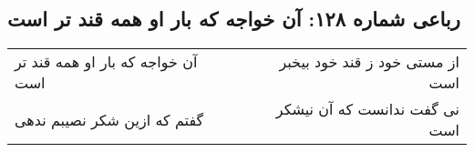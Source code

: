\begin{center}
\section*{رباعی شماره ۱۲۸: آن خواجه که بار او همه قند تر است}
\label{sec:0128}
\begin{longtable}{l p{0.5cm} r}
آن خواجه که بار او همه قند تر است
&&
از مستی خود ز قند خود بیخبر است
\\
گفتم که ازین شکر نصیبم ندهی
&&
نی گفت ندانست که آن نیشکر است
\\
\end{longtable}
\end{center}
